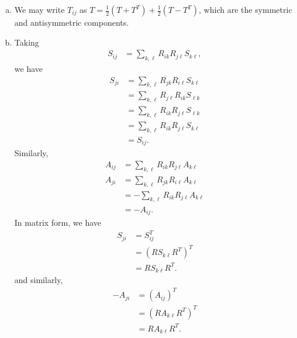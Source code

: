 \documentclass[10pt]{mypackage}
\begin{document}
\begin{solution}[29.11]\hfill
\end{solution}
\begin{enumerate}[(a)]
  \item We may write $T_{ij}$ as $T = \frac{1}{2}\left( T + T^{T} \right) + \frac{1}{2}\left( T - T^{T} \right)$, which are the symmetric and antisymmetric components.
  \item Taking
    \begin{align*}
      S_{ij} &= \sum_{k,\ell}R_{ik}R_{j\ell}S_{k\ell},
    \end{align*}
    we have
    \begin{align*}
      S_{ji} &= \sum_{k,\ell}R_{jk}R_{i\ell}S_{k\ell}\\
             &= \sum_{k,\ell}R_{j\ell}R_{ik}S_{\ell k}\\
             &= \sum_{k,\ell}R_{ik}R_{j\ell}S_{\ell k}\\
             &= \sum_{k,\ell}R_{ik}R_{j \ell}S_{k \ell}\\
             &= S_{ij}.
    \end{align*}
    Similarly,
    \begin{align*}
      A_{ij} &= \sum_{k,\ell}R_{ik}R_{j\ell}A_{k \ell}\\
      A_{ji} &= \sum_{k,\ell}R_{jk}R_{i\ell}A_{k \ell}\\
             &= -\sum_{k,\ell}R_{ik}R_{j\ell}A_{k\ell}\\
             &= -A_{ij}.
    \end{align*}
    In matrix form, we have
    \begin{align*}
      S_{ji} &= S_{ij}^{T}\\
             &= \left( RS_{k\ell} R^{T} \right)^{T}\\
             &= RS_{k\ell}R^{T}.
    \end{align*}
    and similarly,
    \begin{align*}
      -A_{ji} &= \left( A_{ij} \right)^{T}\\
              &= \left( RA_{k\ell}R^{T} \right)^{T}\\
              &= RA_{k\ell}R^{T}.
    \end{align*}
\end{enumerate}
\end{document}
